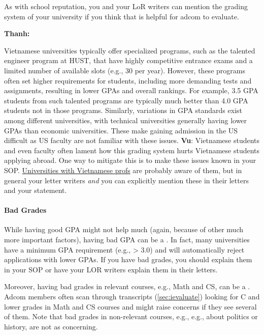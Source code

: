 \documentclass[oneside,11pt,dvipsnames]{book}
\newenvironment{commentbox}[1][]{
  \small
  \begin{mybox}
    {\small \textbf{#1}}
  }{
  \end{mybox}
}
\newcommand{\red}[1]{{\color{red}{#1}}}
\begin{document}
As with school reputation, you and your LoR writers can mention the grading system of your university if you think that is helpful for adcom to evaluate.


\begin{commentbox}[Thanh:]
    Vietnamese universities typically offer specialized programs, such as the talented engineer program at HUST, that have highly competitive entrance exams and a limited number of available slots (e.g., 30 per year). However, these programs often set higher requirements for students, including more demanding tests and assignments, resulting in lower GPAs and overall rankings. For example, 3.5 GPA students from such talented programs are typically much better than 4.0 GPA students not in those programs.  Similarly, variations in GPA standards exist among different universities, with technical universities generally having lower GPAs than economic universities. These make gaining admission in the US difficult as US faculty are not familiar with these issues.
    \tcblower
    \textbf{Vu}: Vietnamese students and even faculty often lament how this grading system hurts Vietnamese students applying abroad. One way to mitigate this is to make these issues known in your SOP.  \href{https://github.com/dynaroars/dynaroars.github.io/wiki/Viet-CS-Profs-US}{Universities with Vietnamese profs} are probably aware of them, but in general your letter writers \emph{and} you can explicitly mention these in their letters and your statement.
  \end{commentbox}

  
\paragraph{Bad Grades} 
While having good GPA might not help much (again, because of other much more important factors),
having bad GPA can be a \red{red flag}. In fact, many universities have a minimum GPA requirement (e.g., > 3.0) and will automatically reject applications with lower GPAs.  
If you have bad grades, you should explain them in your SOP or have your LOR writers explain them in their letters.

Moreover, having bad grades in relevant courses, e.g., Math and CS, can be a \red{red flag}.
Adcom members often scan through transcripts (\autoref{sec:ievaluate}) looking for C and lower grades in Math and CS courses and might raise concerns if they see several of them.
Note that bad grades in non-relevant courses, e.g., e.g., about politics or history, are not as concerning.
\end{document}
